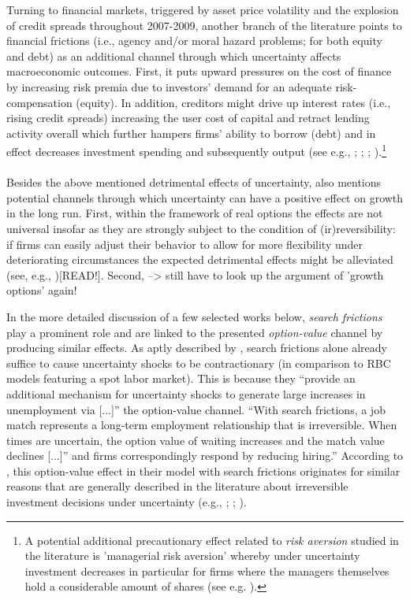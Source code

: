 \documentclass[a4paper,11pt,listof=nochaptergap,oneside,pointednumbers,bibtotoc,bigheadings,liststotoc]{scrbook}
\theoremstyle{mysatz}
\theoremstyle{mydefinition}
\theoremstyle{mybemerkung}
\begin{document}
Turning to financial markets, triggered by asset price volatility and the explosion of credit spreads throughout 2007-2009, another branch of the literature points to financial frictions (i.e., agency and/or moral hazard problems; for both equity and debt) as an additional channel through which uncertainty affects macroeconomic outcomes. First, it puts upward pressures on the cost of finance by increasing risk premia due to investors' demand for an adequate risk-compensation (equity). In addition, creditors might drive up interest rates (i.e., rising credit spreads) increasing the user cost of capital and retract lending activity overall which further hampers firms' ability to borrow (debt) and in effect decreases investment spending and subsequently output (see e.g., \citealp{gilchristetal:14}; \citealp{christianoetal:14}; \citealp{arenalloetal:11}; \citealp{arellanoetal:16}).\footnote{A potential additional precautionary effect related to \textit{risk aversion} studied in the literature is 'managerial risk aversion' whereby under uncertainty investment decreases in particular for firms where the managers themselves hold a considerable amount of shares (see e.g. \citealp{panousiandpananikolaou:12}).}\\
\\
Besides the above mentioned detrimental effects of uncertainty, \citet{bloom:14} also mentions potential channels through which uncertainty can have a positive effect on growth in the long run. First, within the framework of real options the effects are not universal insofar as they are strongly subject to the condition of (ir)reversibility: if firms can easily adjust their behavior to allow for more flexibility under deteriorating circumstances the expected detrimental effects might be alleviated (see, e.g., \citealp{vallettaandbengali:13})[READ!]. Second, --> still have to look up the argument of 'growth options' again!

In the more detailed discussion of a few selected works below, \textit{search frictions} play a prominent role and are linked to the presented \textit{option-value} channel by producing similar effects. As aptly described by \citet{leducandliu:16}, search frictions alone already suffice to cause uncertainty shocks to be contractionary (in comparison to RBC models featuring a spot labor market). This is because they ``provide an additional mechanism for uncertainty shocks to generate large increases in unemployment via [...]'' the option-value channel. ``With search frictions, a job match represents a long-term employment relationship that is irreversible. When times are uncertain, the option value of waiting increases and the match value declines [...]'' and firms correspondingly respond by reducing hiring.'' According to \citet{leducandliu:16}, this option-value effect in their model with search frictions originates for similar reasons that are generally described in the literature about irreversible investment decisions under uncertainty (e.g., \citealp{bernanke:83}; \citealp{bloom:09}; \citealp{bloometal:12}).
\end{document}
